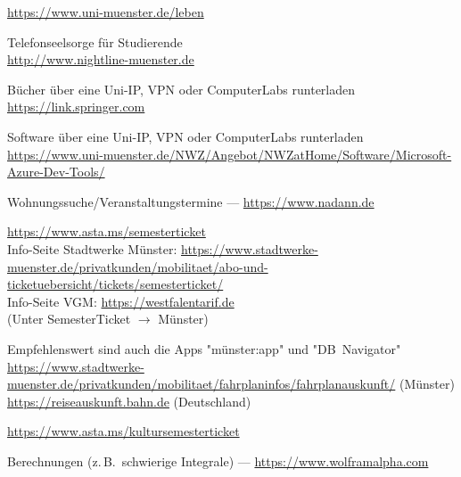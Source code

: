 \begin{description}[parsep=1ex, leftmargin=0pt, itemsep=0.2ex]
	\url{https://www.uni-muenster.de/leben}
	\item[nightline (Tel.:~{\phonenumber{0251 83}[45400]}):] Telefonseelsorge für Studierende\\
	\url{http://www.nightline-muenster.de}
	\item[SpringerLink:] Bücher über eine Uni-IP, VPN oder ComputerLabs runterladen\\
	\url{https://link.springer.com}
	\item[Microsoft-Produkte (Azure Dev Tools):] Software über eine Uni-IP, VPN oder ComputerLabs runterladen\\
	\url{https://www.uni-muenster.de/NWZ/Angebot/NWZatHome/Software/Microsoft-Azure-Dev-Tools/}
	\item[na dann\dots:] Wohnungssuche/Veranstaltungstermine
	---
	\url{https://www.nadann.de}
	\item[Semesterticket:] \url{https://www.asta.ms/semesterticket}\\
	Info-Seite Stadtwerke Münster: \url{https://www.stadtwerke-muenster.de/privatkunden/mobilitaet/abo-und-ticketuebersicht/tickets/semesterticket/}\\
	Info-Seite VGM: \url{https://westfalentarif.de}\\
	(Unter SemesterTicket $\rightarrow$ Münster)

	\item[ÖPNV-Fahrplanauskunft:] Empfehlenswert sind auch die Apps "münster:app" und "DB~Navigator"\\
	\url{https://www.stadtwerke-muenster.de/privatkunden/mobilitaet/fahrplaninfos/fahrplanauskunft/} (Münster)\\

	\url{https://reiseauskunft.bahn.de} (Deutschland)
	\item[Kultursemesterticket:] \url{https://www.asta.ms/kultursemesterticket}
	\item[WolframAlpha:] Berechnungen (z.\,B.\ schwierige Integrale)
	---
	\url{https://www.wolframalpha.com}
\end{description}

